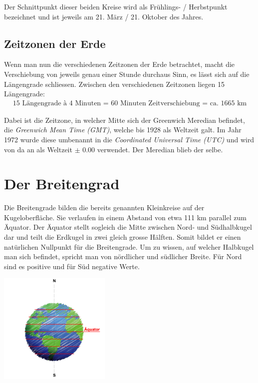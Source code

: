 \begin{refsection}
Der Schnittpunkt dieser beiden Kreise wird als Frühlings- / Herbstpunkt bezeichnet und ist jeweils am 21. März / 21. Oktober des Jahres.


\subsection{Zeitzonen der Erde} \label{Zeitzonen} 
Wenn man nun die verschiedenen Zeitzonen der Erde betrachtet, macht die Verschiebung von jeweils genau einer Stunde durchaus Sinn, es lässt sich auf die Längengrade schliessen.
Zwischen den verschiedenen Zeitzonen liegen 15 Längengrade:
\begin{align*}
\text{15 Längengrade à 4 Minuten = 60 Minuten Zeitverschiebung = ca. 1665 km}
\end{align*}

Dabei ist die Zeitzone, in welcher Mitte sich der Greenwich Meredian befindet, die \textit{Greenwich Mean Time (GMT)}, welche bis 1928 als Weltzeit galt. Im Jahr 1972 wurde diese umbenannt in die \textit{Coordinated Universal Time (UTC)} und wird von da an als Weltzeit $\pm$ 0.00 verwendet. Der Meredian blieb der selbe.


\section{Der Breitengrad}
Die Breitengrade bilden die bereits genannten Kleinkreise auf der Kugeloberfläche. Sie verlaufen in einem Abstand von etwa 111 km parallel zum Äquator. Der Äquator stellt sogleich die Mitte zwischen Nord- und Südhalbkugel dar und teilt die Erdkugel in zwei gleich grosse Hälften. Somit bildet er einen natürlichen Nullpunkt für die Breitengrade.
Um zu wissen, auf welcher Halbkugel man sich befindet, spricht man von nördlicher und südlicher Breite. Für Nord sind es positive und für Süd negative Werte.

\begin{center}
        \includegraphics[width=0.4\textwidth]{kugel/BreiteErdkugel.jpg}
\end{center}



\end{refsection}
